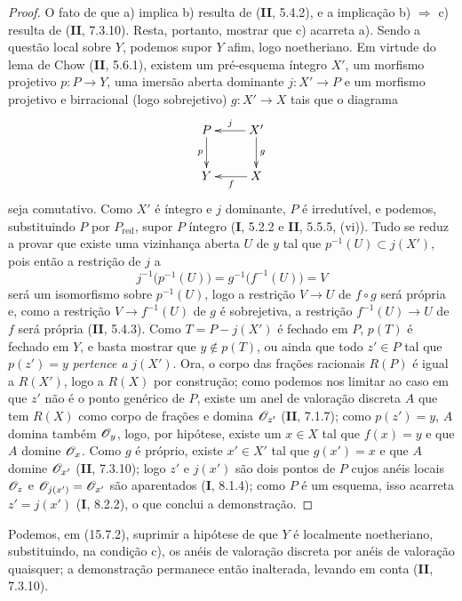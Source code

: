 \begin{proof}
O fato de que a) implica b) resulta de (\textbf{II}, 5.4.2), e a implicação b) $\Rightarrow$ c) resulta de (\textbf{II}, 7.3.10). Resta, portanto, mostrar que c) acarreta a). Sendo a questão local sobre $Y$, podemos supor $Y$ afim, logo noetheriano. Em virtude do lema de Chow (\textbf{II}, 5.6.1), existem um pré-esquema íntegro $X'$, um morfismo projetivo $p:P\to Y$, uma imersão aberta dominante $j:X'\to P$ e um morfismo projetivo e birracional (logo sobrejetivo) $g:X'\to X$ tais que o diagrama
\[
\xymatrix{
P\ar[d]_-{p} & X'\ar[l]_-{j}\ar[d]^-{g}\\
Y & X\ar[l]^-{f}
}
\]
seja comutativo. Como $X'$ é íntegro e $j$ dominante, $P$ é irredutível, e podemos, substituindo $P$ por $P_{\mathrm{red}}$, supor $P$ íntegro (\textbf{I}, 5.2.2 e \textbf{II}, 5.5.5, (vi)). Tudo se reduz a provar que existe uma vizinhança aberta $U$ de $y$ tal que $p^{-1}(U)\subset j(X')$, pois então a restrição de $j$ a
\[
j^{-1}\bigl(p^{-1}(U)\bigr)=g^{-1}\bigl(f^{-1}(U)\bigr)=V
\]
será um isomorfismo sobre $p^{-1}(U)$, logo a restrição $V\to U$ de $f\circ g$ será própria e, como a restrição $V\to f^{-1}(U)$ de $g$ é sobrejetiva, a restrição $f^{-1}(U)\to U$ de $f$ será própria (\textbf{II}, 5.4.3). Como $T=P-j(X')$ é fechado em $P$, $p(T)$ é fechado em $Y$, e basta mostrar que $y\notin p(T)$, ou ainda que todo $z'\in P$ tal que $p(z')=y$ \emph{pertence a} $j(X')$. Ora, o corpo das frações racionais $R(P)$ é igual a $R(X')$, logo a $R(X)$ por construção; como podemos nos limitar ao caso em que $z'$ não é o ponto genérico de $P$, existe um anel de valoração discreta $A$ que tem $R(X)$ como corpo de frações e domina $\mathscr{O}_{z'}$ (\textbf{II}, 7.1.7); como $p(z')=y$, $A$ domina também $\mathscr{O}_y$, logo, por hipótese, existe um $x\in X$ tal que $f(x)=y$ e que $A$ domine $\mathscr{O}_x$. Como $g$ é próprio, existe $x'\in X'$ tal que $g(x')=x$ e que $A$ domine $\mathscr{O}_{x'}$ (\textbf{II}, 7.3.10); logo $z'$ e $j(x')$ são dois pontos de $P$ cujos anéis locais $\mathscr{O}_z$ e $\mathscr{O}_{j(x')}=\mathscr{O}_{x'}$ são aparentados (\textbf{I}, 8.1.4); como $P$ é um esquema, isso acarreta $z'=j(x')$ (\textbf{I}, 8.2.2), o que conclui a demonstração.
\end{proof}

\begin{remark}[15.7.3]
\label{IV.15.7.3}
Podemos, em (15.7.2), suprimir a hipótese de que $Y$ é localmente noetheriano, substituindo, na condição c), os anéis de valoração discreta por anéis de valoração quaisquer; a demonstração permanece então inalterada, levando em conta (\textbf{II}, 7.3.10).
\end{remark}


